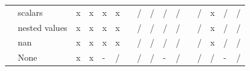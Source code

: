 \documentclass{article}
\begin{document}
\begin{longtable}{llllllllllllllll}
                & scalars                   & \cellcolor[HTML]{B7E1CD}x & \cellcolor[HTML]{B7E1CD}x & \cellcolor[HTML]{B7E1CD}x & \cellcolor[HTML]{B7E1CD}x &  & \cellcolor[HTML]{F4CCCC}/ & \cellcolor[HTML]{F4CCCC}/ & \cellcolor[HTML]{F4CCCC}/ & \cellcolor[HTML]{F4CCCC}/ &  & \cellcolor[HTML]{F4CCCC}/ & \cellcolor[HTML]{B7E1CD}x & \cellcolor[HTML]{F4CCCC}/ & \cellcolor[HTML]{F4CCCC}/ \\
                & nested values             & \cellcolor[HTML]{B7E1CD}x & \cellcolor[HTML]{B7E1CD}x & \cellcolor[HTML]{B7E1CD}x & \cellcolor[HTML]{B7E1CD}x &  & \cellcolor[HTML]{F4CCCC}/ & \cellcolor[HTML]{F4CCCC}/ & \cellcolor[HTML]{F4CCCC}/ & \cellcolor[HTML]{F4CCCC}/ &  & \cellcolor[HTML]{F4CCCC}/ & \cellcolor[HTML]{B7E1CD}x & \cellcolor[HTML]{F4CCCC}/ & \cellcolor[HTML]{F4CCCC}/ \\
                & nan                       & \cellcolor[HTML]{B7E1CD}x & \cellcolor[HTML]{B7E1CD}x & \cellcolor[HTML]{B7E1CD}x & \cellcolor[HTML]{B7E1CD}x &  & \cellcolor[HTML]{F4CCCC}/ & \cellcolor[HTML]{F4CCCC}/ & \cellcolor[HTML]{F4CCCC}/ & \cellcolor[HTML]{F4CCCC}/ &  & \cellcolor[HTML]{F4CCCC}/ & \cellcolor[HTML]{B7E1CD}x & \cellcolor[HTML]{F4CCCC}/ & \cellcolor[HTML]{F4CCCC}/ \\
                & None                      & \cellcolor[HTML]{B7E1CD}x & \cellcolor[HTML]{B7E1CD}x & \cellcolor[HTML]{CFE2F3}- & \cellcolor[HTML]{F4CCCC}/ &  & \cellcolor[HTML]{F4CCCC}/ & \cellcolor[HTML]{F4CCCC}/ & \cellcolor[HTML]{CFE2F3}- & \cellcolor[HTML]{F4CCCC}/ &  & \cellcolor[HTML]{F4CCCC}/ & \cellcolor[HTML]{F4CCCC}/ & \cellcolor[HTML]{CFE2F3}- & \cellcolor[HTML]{F4CCCC}/

\end{longtable}%
\end{document}
